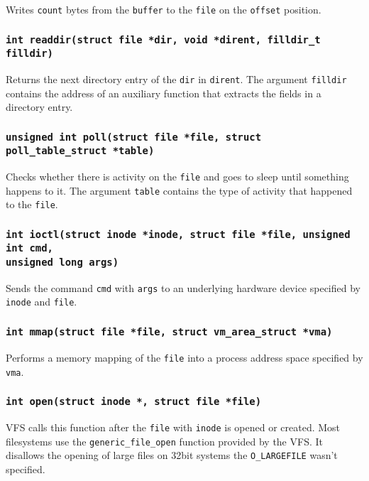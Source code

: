 Writes \texttt{count} bytes from the \texttt{buffer} to the \texttt{file} on the
\texttt{offset} position.

\subsubsection{\texttt{int readdir(struct file *dir, void *dirent, filldir\_t filldir)}}

Returns the next directory entry of the \texttt{dir} in \texttt{dirent}. The argument
\texttt{filldir} contains the address of an auxiliary function that extracts the
fields in a directory entry.

\subsubsection{\texttt{unsigned int poll(struct file *file, struct poll\_table\_struct
*table)}}

Checks whether there is activity on the \texttt{file} and goes to sleep until
something happens to it. The argument \texttt{table} contains the type of activity that
happened to the \texttt{file}.

\subsubsection{\texttt{int ioctl(struct inode *inode, struct file *file, unsigned int
cmd,\\unsigned long args)}}

Sends the command \texttt{cmd} with \texttt{args} to an underlying hardware device
specified by \texttt{inode} and \texttt{file}.

\subsubsection{\texttt{int mmap(struct file *file, struct vm\_area\_struct *vma)}}

Performs a memory mapping of the \texttt{file} into a process address space specified
by \texttt{vma}.

\subsubsection{\texttt{int open(struct inode *, struct file *file)}}

VFS calls this function after the \texttt{file} with \texttt{inode} is opened or
created. Most filesystems use the \texttt{generic\_file\_open} function provided by
the VFS. It disallows the opening of large files on 32bit systems the \texttt{O\_LARGEFILE}
wasn't specified.

